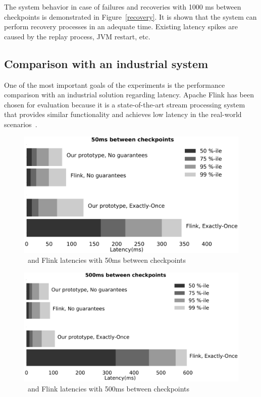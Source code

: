 The system behavior in case of failures and recoveries with 1000 ms between checkpoints is demonstrated in Figure~\ref{recovery}. It is shown that the system can perform recovery processes in an adequate time. Existing latency spikes are caused by the replay process, JVM restart, etc.

\subsection{Comparison with an industrial system}
One of the most important goals of the experiments is the performance comparison with an industrial solution regarding latency. Apache Flink has been chosen for evaluation because it is a state-of-the-art stream processing system that provides similar functionality and achieves low latency in the real-world scenarios~\cite{S7530084}. 

\begin{figure}[t]
  \centering
  \includegraphics[width=.8\textwidth]{Chapters/DeterministicModelRuntime/pics/comparison50}
  \caption{\FlameStream\ and Flink latencies with 50ms between checkpoints}
  \label{comparison50}
\end{figure}

\begin{figure}[t]
  \centering
  \includegraphics[width=.8\textwidth]{Chapters/DeterministicModelRuntime/pics/comparison500}
  \caption{\FlameStream\ and Flink latencies with 500ms between checkpoints}
  \label{comparison500}
\end{figure}

